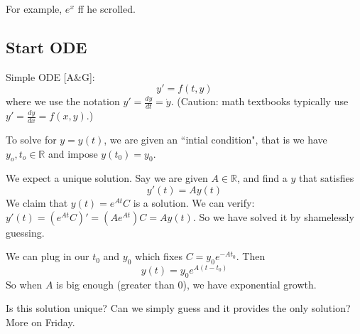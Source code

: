 \documentclass{article}
\theoremstyle{plain}
\theoremstyle{remark}
\newcommand{\R}{{\mathbb R}}
\begin{document}
For example, $e^x$ ff he scrolled.

\subsection{Start ODE}
Simple ODE [A\&G]:
\[
	y' = f(t,y)
\]
where we use the notation $y' = \frac{dy}{dt} = \dot{y}$.
(Caution: math textbooks typically use $y' = \frac{dy}{dx} = f(x,y)$.)

To solve for $y = y(t)$, we are given an ``intial condition",
that is we have $y_o,t_o \in \R$ and impose $y(t_0) = y_0$.

We expect a unique solution. Say we are given $A \in \R$, and find a $y$ that satisfies
\[
	y'(t) = Ay(t)
\]
We claim that $y(t) = e^{At}C$ is a solution.
We can verify: $y'(t) = (e^{At}C)' = (Ae^{At})C = Ay(t)$.
So we have solved it by shamelessly guessing.

We can plug in our $t_0$ and $y_0$ which fixes $C = y_0e^{-At_0}$.
Then
\[
	y(t) = y_0 e^{A(t-t_0)}
\]
So when $A$ is big enough (greater than $0$),
we have exponential growth.

Is this solution unique? Can we simply guess and it provides the only solution? More on Friday.
\end{document}
